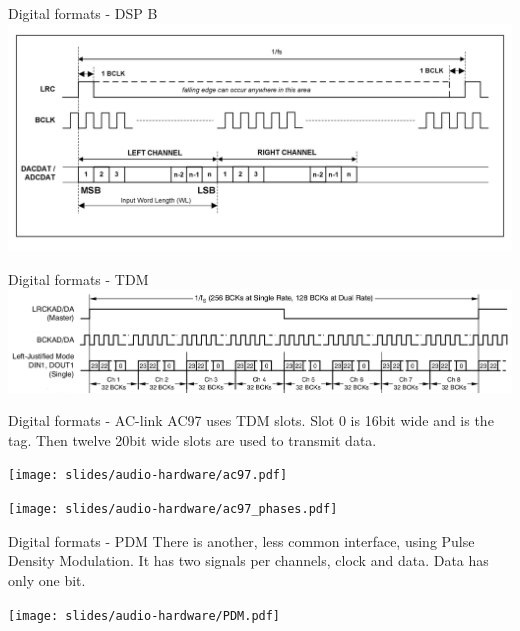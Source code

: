 \begin{frame}{Digital formats - DSP B}
    \includegraphics[width=\textwidth]{slides/audio-hardware/DSP_B.png}\\
\end{frame}

\begin{frame}{Digital formats - TDM}
    \includegraphics[width=\textwidth]{slides/audio-hardware/TDM.png}\\
\end{frame}

\begin{frame}{Digital formats - AC-link}
  AC97 uses TDM slots. Slot 0 is 16bit wide and is the tag. Then
  twelve 20bit wide slots are used to transmit data.
  \begin{center}
    \texttt{[image: slides/audio-hardware/ac97.pdf]}\\
  \end{center}
  \begin{center}
    \texttt{[image: slides/audio-hardware/ac97\_phases.pdf]}\\
  \end{center}
\end{frame}

\begin{frame}{Digital formats - PDM}
  There is another, less common interface, using Pulse Density
  Modulation. It has two signals per channels, clock and data. Data
  has only one bit.\\
  \begin{center}
    \texttt{[image: slides/audio-hardware/PDM.pdf]}\\
  \end{center}
\end{frame}


